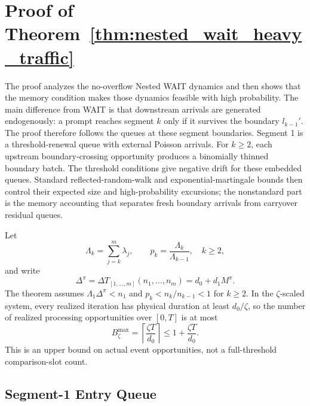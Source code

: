 
\section{Proof of Theorem~\ref{thm:nested_wait_heavy_traffic}}\label{appendix::proof of nested_wait_heavy_traffic}

The proof analyzes the no-overflow Nested WAIT dynamics and then shows that the memory condition makes those dynamics feasible with high probability. The main difference from WAIT is that downstream arrivals are generated endogenously: a prompt reaches segment \(k\) only if it survives the boundary \(l_{k-1}'\). The proof therefore follows the queues at these segment boundaries. Segment 1 is a threshold-renewal queue with external Poisson arrivals. For \(k\ge2\), each upstream boundary-crossing opportunity produces a binomially thinned boundary batch. The threshold conditions give negative drift for these embedded queues. Standard reflected-random-walk and exponential-martingale bounds then control their expected size and high-probability excursions; the nonstandard part is the memory accounting that separates fresh boundary arrivals from carryover residual queues.

Let
\[
    \Lambda_k=\sum_{j=k}^m\lambda_j,\qquad
    p_k=\frac{\Lambda_k}{\Lambda_{k-1}},\quad k\ge2,
\]
and write
\[
    \Delta^\pi=\Delta T_{[1,\ldots,m]}(n_1,\ldots,n_m)=d_0+d_1M^\pi .
\]
The theorem assumes \(\Lambda_1\Delta^\pi<n_1\) and \(p_k<n_k/n_{k-1}<1\) for \(k\ge2\). In the \(\zeta\)-scaled system, every realized iteration has physical duration at least \(d_0/\zeta\), so the number of realized processing opportunities over \([0,T]\) is at most
\[
    B_\zeta^{\max}=\left\lceil \frac{\zeta T}{d_0}\right\rceil
    \le 1+\frac{\zeta T}{d_0}.
\]
This is an upper bound on actual event opportunities, not a full-threshold comparison-slot count.

\subsection{Segment-1 Entry Queue}

